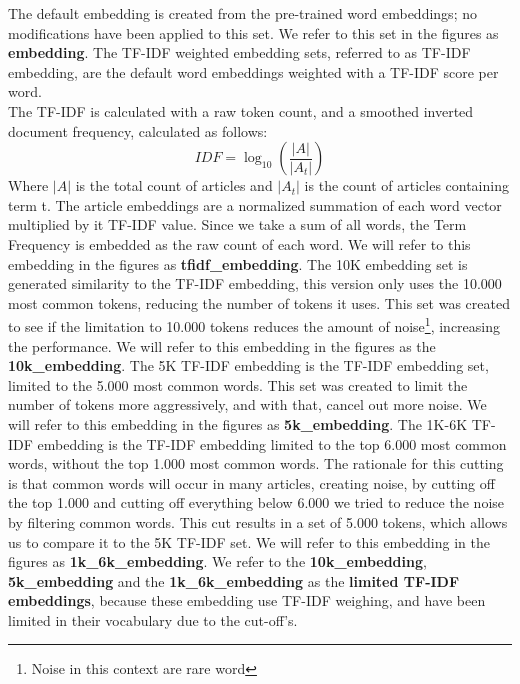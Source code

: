 \documentclass[../../Thesis.tex]{subfiles}
\begin{document}
The default embedding is created from the pre-trained word embeddings; no modifications have been applied to this set. We refer to this set in the figures as \textbf{embedding}.
The TF-IDF weighted embedding sets, referred to as TF-IDF embedding, are the default word embeddings weighted with a TF-IDF score per word.\\
The TF-IDF is calculated with a raw token count, and a smoothed inverted document frequency, calculated as follows:\\
\begin{equation}
IDF = \log_{10}(\dfrac{|A|}{|A_t|})
\end{equation}
Where $|A|$ is the total count of articles and $|A_t|$ is the count of articles containing term t.
The article embeddings are a normalized summation of each word vector multiplied by it TF-IDF value. Since we take a sum of all words, the Term Frequency is embedded as the raw count of each word. We will refer to this embedding in the figures as \textbf{tfidf\_embedding}.
The 10K embedding set is generated similarity to the TF-IDF embedding, this version only uses the 10.000 most common tokens, reducing the number of tokens it uses. This set was created to see if the limitation to 10.000 tokens reduces the amount of noise\footnote{Noise in this context are rare word}, increasing the performance. We will refer to this embedding in the figures as the \textbf{10k\_embedding}.
The 5K TF-IDF embedding is the TF-IDF embedding set, limited to the 5.000 most common words. This set was created to limit the number of tokens more aggressively, and with that, cancel out more noise. We will refer to this embedding in the figures as \textbf{5k\_embedding}.
The 1K-6K TF-IDF embedding is the TF-IDF embedding limited to the top 6.000 most common words, without the top 1.000 most common words. The rationale for this cutting is that common words will occur in many articles, creating noise, by cutting off the top 1.000 and cutting off everything below 6.000 we tried to reduce the noise by filtering common words. This cut results in a set of 5.000 tokens, which allows us to compare it to the 5K TF-IDF set. We will refer to this embedding in the figures as \textbf{1k\_6k\_embedding}. We refer to the \textbf{10k\_embedding}, \textbf{5k\_embedding} and the \textbf{1k\_6k\_embedding} as the \textbf{limited TF-IDF embeddings}, because these embedding use TF-IDF weighing, and have been limited in their vocabulary due to the cut-off's.
\end{document}
